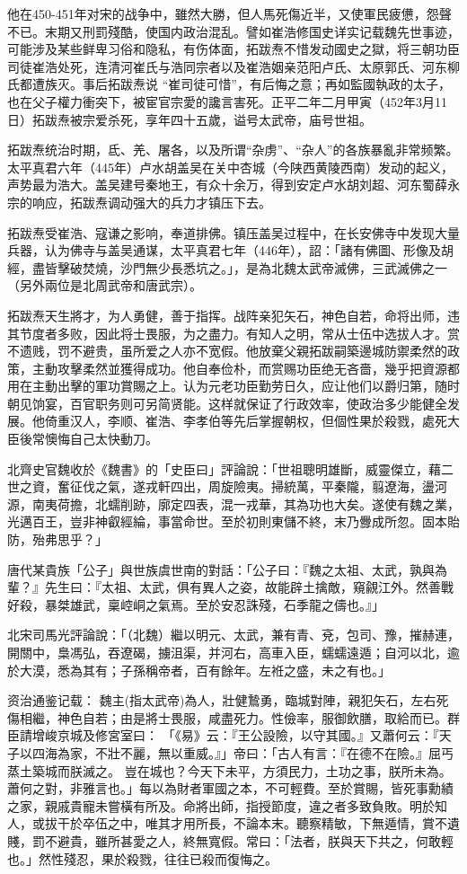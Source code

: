 他在450-451年对宋的战争中，雖然大勝，但人馬死傷近半，又使軍民疲憊，怨聲不已。末期又刑罰殘酷，使国内政治混乱。譬如崔浩修国史详实记载魏先世事迹，可能涉及某些鲜卑习俗和隐私，有伤体面，拓跋焘不惜发动國史之獄，将三朝功臣司徒崔浩处死，连清河崔氏与浩同宗者以及崔浩姻亲范阳卢氏、太原郭氏、河东柳氏都遭族灭。事后拓跋焘说 “崔司徒可惜”，有后悔之意；再如監國執政的太子，也在父子權力衝突下，被宦官宗愛的讒言害死。正平二年二月甲寅（452年3月11日）拓跋焘被宗爱杀死，享年四十五歲，谥号太武帝，庙号世祖。

拓跋焘统治时期，氐、羌、屠各，以及所谓“杂虏”、“杂人”的各族暴亂非常频繁。太平真君六年（445年）卢水胡盖吴在关中杏城（今陕西黄陵西南）发动的起义，声势最为浩大。盖吴建号秦地王，有众十余万，得到安定卢水胡刘超、河东蜀薛永宗的响应，拓跋焘调动强大的兵力才镇压下去。

拓跋焘受崔浩、寇谦之影响，奉道排佛。镇压盖吴过程中，在长安佛寺中发现大量兵器，认为佛寺与盖吴通谋，太平真君七年（446年），詔：「諸有佛圖、形像及胡經，盡皆擊破焚燒，沙門無少長悉坑之。」，是為北魏太武帝滅佛，三武滅佛之一（另外兩位是北周武帝和唐武宗）。

拓跋焘天生將才，为人勇健，善于指挥。战阵亲犯矢石，神色自若，命将出师，违其节度者多败，因此将士畏服，为之盡力。有知人之明，常从士伍中选拔人才。赏不遗贱，罚不避贵，虽所爱之人亦不宽假。他放棄父親拓跋嗣築邊城防禦柔然的政策，主動攻擊柔然並獲得成功。他自奉俭朴，而赏赐功臣绝无吝嗇，幾乎把資源都用在主動出擊的軍功賞賜之上。认为元老功臣勤劳日久，应让他们以爵归第，随时朝见饷宴，百官职务则可另简贤能。这样就保证了行政效率，使政治多少能健全发展。他倚重汉人，李顺、崔浩、李孝伯等先后掌握朝权，但個性果於殺戮，處死大臣後常懊悔自己太快動刀。

北齊史官魏收於《魏書》的「史臣曰」評論說：「世祖聰明雄斷，威靈傑立，藉二世之資，奮征伐之氣，遂戎軒四出，周旋險夷。掃統萬，平秦隴，翦遼海，盪河源，南夷荷擔，北蠕削跡，廓定四表，混一戎華，其為功也大矣。遂使有魏之業，光邁百王，豈非神叡經綸，事當命世。至於初則東儲不終，末乃釁成所忽。固本貽防，殆弗思乎？」

唐代某貴族「公子」與世族虞世南的對話：「公子曰：『魏之太祖、太武，孰與為輩？』先生曰：『太祖、太武，俱有異人之姿，故能辟土擒敵，窺覦江外。然善戰好殺，暴桀雄武，稟崆峒之氣焉。至於安忍誅殘，石季龍之儔也。』」

北宋司馬光評論說：「（北魏）繼以明元、太武，兼有青、兗，包司、豫，摧赫連，開關中，梟馮弘，吞遼碣，擄沮渠，并河右，高車入臣，蠕蠕遠遁；自河以北，逾於大漠，悉為其有；子孫稱帝者，百有餘年。左袵之盛，未之有也。」

资治通鉴记载： 魏主(指太武帝)為人，壯健鷙勇，臨城對陣，親犯矢石，左右死傷相繼，神色自若；由是將士畏服，咸盡死力。性儉率，服御飲膳，取給而已。群臣請增峻京城及修宮室曰： 「《易》云：『王公設險，以守其國。』又蕭何云：『天子以四海為家，不壯不麗，無以重威。』」帝曰：「古人有言：『在德不在險。』屈丐蒸土築城而朕滅之。 豈在城也？今天下未平，方須民力，土功之事，朕所未為。蕭何之對，非雅言也。」每以為財者軍國之本，不可輕費。至於賞賜，皆死事勳績之家，親戚貴寵未嘗橫有所及。命將出師，指授節度，違之者多致負敗。明於知人，或拔干於卒伍之中，唯其才用所長，不論本末。聽察精敏，下無遁情，賞不遺賤，罰不避貴，雖所甚愛之人，終無寬假。常曰：「法者，朕與天下共之，何敢輕也。」然性殘忍，果於殺戮，往往已殺而復悔之。

